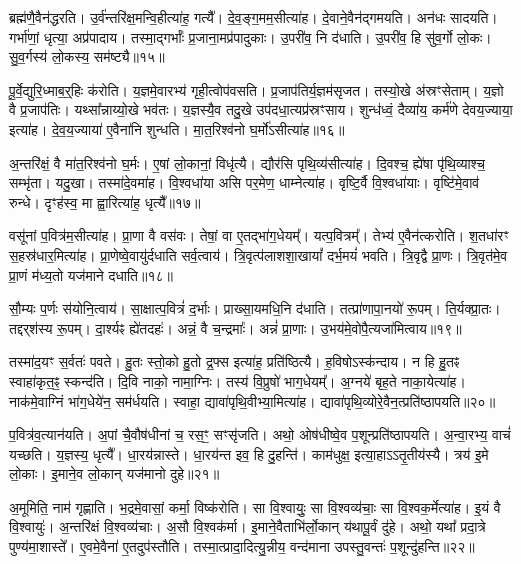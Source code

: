ब्रह्म॑णै॒वैन॑द्धरति।
उ॒र्व॑न्तरि॑क्ष॒मन्वि॒हीत्या॑ह॒ गत्यै᳚।
दे॒व॒ङ्ग॒मम॒सी\-त्या॑ह।
दे॒वाने॒वैन॑द्गमयति।
अन॑धः सादयति।
गर्भा॑णां॒ धृत्या॒ अप्र॑पादाय।
तस्मा॒द्गर्भाः᳚ प्र॒जाना॒मप्र॑पादुकाः।
उ॒परी॑व॒ नि द॑धाति।
उ॒परी॑व॒ हि सु॑व॒र्गो लो॒कः।
सु॒व॒र्गस्य॑ लो॒कस्य॒ सम॑ष्ट्यै॥१५॥\ip\anuvakamend[स॒यो॒नि॒त्वाय॑ स्व॒धाकृ॑ता॒\-ऽसीत्या॑ह दाया॒द्वेद॑ भरति जायन्ते॒ बृह॒स्पतिः॒ सम॑ष्ट्यै]

पू॒र्वे॒द्युरि॒ध्माब॒र्॒हिः क॑रोति।
य॒ज्ञमे॒वारभ्य॑ गृही॒त्वोप॑वसति।
प्र॒जा\-प॑तिर्य॒ज्ञम॑\-सृजत।
तस्यो॒खे अ॑स्रꣳसेताम्।
य॒ज्ञो वै प्र॒जा\-प॑तिः।
यथ्सा᳚न्नाय्यो॒खे भव॑तः।
य॒ज्ञस्यै॒व तदु॒खे उप॑दधा॒त्यप्र॑स्रꣳसाय।
शुन्ध॑ध्वं॒ दैव्या॑य॒ कर्म॑णे देवय॒ज्याया॒ इत्या॑ह।
दे॒व॒य॒ज्याया॑ ए॒वैना॑नि शुन्धति।
मा॒त॒रिश्व॑नो घ॒र्मो॑\-ऽसीत्या॑ह॥१६॥\ip

अ॒न्तरि॑क्षं॒ वै मा॑त॒रिश्व॑नो घ॒र्मः।
ए॒षां लो॒कानां॒ विधृ॑त्यै।
द्यौर॑सि पृथि॒व्य॑सीत्या॑ह।
दि॒वश्च॒ ह्ये॑षा पृ॑थि॒व्याश्च॒ सम्भृ॑ता।
यदु॒खा।
तस्मा॑दे॒वमा॑ह।
वि॒श्वधा॑या असि पर॒मेण॒ धाम्नेत्या॑ह।
वृष्टि॒र्वै वि॒श्वधा॑याः।
वृष्टि॑मे॒वाव॑ रुन्धे।
दृꣳह॑स्व॒ मा ह्वा॒रित्या॑ह॒ धृत्यै᳚॥१७॥\ip

वसू॑नां प॒वित्र॑म॒सीत्या॑ह।
प्रा॒णा वै वस॑वः।
तेषां॒ वा ए॒तद्भा॑ग॒धेयम्᳚।
यत्प॒वित्रम्᳚।
तेभ्य॑ ए॒वैन॑त्करोति।
श॒तधा॑रꣳ स॒हस्र॑धार॒मित्या॑ह।
प्रा॒णेष्वे॒वायु॑र्दधाति सर्व॒त्वाय॑।
त्रि॒वृत्प॑लाश\-शा॒खायां᳚ दर्भ॒मयं॑ भवति।
त्रि॒वृद्वै प्रा॒णः।
त्रि॒वृत॑मे॒व प्रा॒णं म॑ध्य॒तो यज॑माने दधाति॥१८॥\ip

सौ॒म्यः प॒र्णः स॑योनि॒त्वाय॑।
सा॒क्षात्प॒वित्रं॑ द॒र्भाः।
प्राख्सा॒यमधि॒नि द॑धाति।
तत्प्रा॑णापा॒नयो॑ रू॒पम्।
ति॒र्यक्प्रा॒तः।
तद्दर्‌श॑स्य रू॒पम्।
दा॒र्श्यꣴ ह्ये॑तदहः॑।
अन्नं॒ वै च॒न्द्रमाः᳚।
अन्नं॑ प्रा॒णाः।
उ॒भय॑मे॒वोपै॒त्यजा॑मित्वाय॥१९॥\ip

तस्मा॑द॒यꣳ स॒र्वतः॑ पवते।
हु॒तः स्तो॒को हु॒तो द्र॒फ्स इत्या॑ह॒ प्रति॑\-ष्ठित्यै।
ह॒विषो\-ऽस्क॑न्दाय।
न हि हु॒तꣴ स्वाहा॑कृत॒ꣴ॒ स्कन्द॑ति।
दि॒वि नाको॒ नामा॒ग्निः।
तस्य॑ वि॒प्रुषो॑ भाग॒धेयम्᳚।
अ॒ग्नये॑ बृह॒ते नाका॒येत्या॑ह।
नाक॑मे॒वाग्निं भा॑ग॒धेये॑न॒ सम॑र्धयति।
स्वाहा॒ द्यावा॑पृथि॒वीभ्या॒मित्या॑ह।
द्यावा॑पृथि॒व्योरे॒वैन॒त्प्रति॑\-ष्ठापयति॥२०॥\ip

प॒वित्र॑व॒त्यान॑यति।
अ॒पां चै॒वौष॑धीनां च॒ रस॒ꣳ॒ सꣳसृ॑जति।
अथो॒ ओष॑धीष्वे॒व प॒शून्प्रति॑\-ष्ठापयति।
अ॒न्वा॒रभ्य॒ वाचं॑ यच्छति।
य॒ज्ञस्य॒ धृत्यै᳚।
धा॒रय॑न्नास्ते।
धा॒रय॑न्त इव॒ हि दु॒हन्ति॑।
काम॑धुक्ष॒ इत्या॒हाऽऽतृ॒तीय॑स्यै।
त्रय॑ इ॒मे लो॒काः।
इ॒माने॒व लो॒कान् ‌यज॑मानो दुहे॥२१॥\ip

अ॒मूमिति॒ नाम॑ गृह्णाति।
भ॒द्रमे॒वासां॒ कर्मा॒ विष्क॑रोति।
सा वि॒श्वायुः॒ सा वि॒श्वव्य॑चाः॒ सा वि॒श्वक॒र्मेत्या॑ह।
इ॒यं वै वि॒श्वायुः॑।
अ॒न्तरि॑क्षं वि॒श्वव्य॑चाः।
अ॒सौ वि॒श्वक॑र्मा।
इ॒माने॒वैताभि॑र्लो॒कान्‌ य॑थापू॒र्वं दु॑हे।
अथो॒ यथा᳚ प्रदा॒त्रे पुण्य॑मा॒शास्ते᳚।
ए॒वमे॒वैना॑ ए॒तदुप॑स्तौति।
तस्मा॒त्प्रादा॒दित्यु॒न्नीय॒ वन्द॑माना उपस्तु॒वन्तः॑ प॒शून्दु॑\-हन्ति॥२२॥\ip

